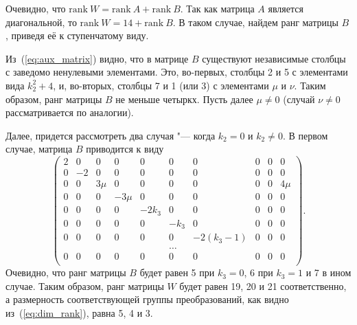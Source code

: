 \documentclass[../main.tex]{subfiles}
\begin{document}
Очевидно, что $\mathrm{rank}~W = \mathrm{rank}~A + \mathrm{rank}~B$. Так как матрица $A$ является диагональной, то $\mathrm{rank}~W = 14 + \mathrm{rank}~B$. В таком случае, найдем ранг матрицы $B$, приведя её к ступенчатому виду. 

Из~(\ref{eq:aux_matrix}) видно, что в матрице $B$ существуют независимые столбцы с заведомо ненулевыми элементами. Это, во-первых, столбцы 2 и 5 с элементами вида $k_2^2 + 4$, и, во-вторых, столбцы 7 и 1 (или 3) с элементами $\mu$ и $\nu$. Таким образом, ранг матрицы $B$ не меньше четыркх. Пусть далее $\mu \ne 0$ (случай $\nu \ne 0$ рассматривается по аналогии). 

Далее, придется рассмотреть два случая "--- когда $k_2 = 0$ и $k_2 \ne 0$. В первом случае, матрица $B$ приводится к виду
\begin{equation*} 
\left(
\begin{array}{cccccccccc}
 2 & 0 & 0 & 0 & 0 & 0 & 0 & 0 & 0 & 0 \\
 0 & -2 & 0 & 0 & 0 & 0 & 0 & 0 & 0 & 0 \\
 0 & 0 & 3 \mu  & 0 & 0 & 0 & 0 & 0 & 0 & 4 \mu  \\
 0 & 0 & 0 & -3 \mu  & 0 & 0 & 0 & 0 & 0 & 0 \\
 0 & 0 & 0 & 0 & -2 k_3 & 0 & 0 & 0 & 0 & 0 \\
 0 & 0 & 0 & 0 & 0 & -k_3 & 0 & 0 & 0 & 0 \\
 0 & 0 & 0 & 0 & 0 & 0 & -2 \left(k_3-1\right) & 0 & 0 & 0 \\
   &   &   &   &   & \hdots &   &   &   &   \\
 0 & 0 & 0 & 0 & 0 & 0 & 0 & 0 & 0 & 0 \\
\end{array}
\right).
\end{equation*} 
Очевидно, что ранг матрицы $B$ будет равен 5 при $k_3 = 0$, 6 при $k_3 = 1$ и 7 в ином случае. Таким образом, ранг матрицы $W$ будет равен 19, 20 и 21 соответственно, а размерность соответствующей группы преобразований, как видно из~(\ref{eq:dim_rank}), равна 5, 4 и 3.
\end{document}
